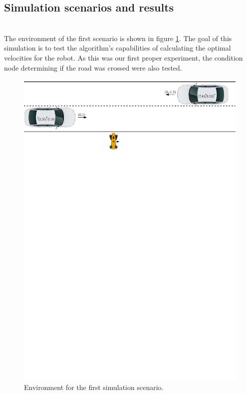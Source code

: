     \subsection{Simulation scenarios and results}
        \\
            The environment of the first scenario is shown in figure \ref{fig:scene1}. The goal of this simulation is to test the algorithm's capabilities of calculating the optimal velocities for the robot. As this was our first proper experiment, the condition node determining if the road was crossed were also tested.\\
            \begin{figure}[ht]
                \centering
                \includegraphics[width=\linewidth]{images/simulations/scene1.pdf}
                \caption{Environment for the first simulation scenario.}
                \label{fig:scene1}
            \end{figure}
